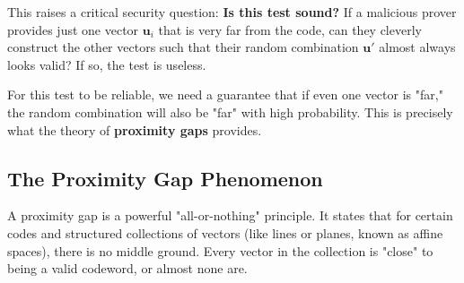 \documentclass{article}
\begin{document}
This raises a critical security question: \textbf{Is this test sound?} If a malicious prover provides just one vector $\mathbf{u}_i$ that is very far from the code, can they cleverly construct the other vectors such that their random combination $\mathbf{u}'$ almost always looks valid? If so, the test is useless.

For this test to be reliable, we need a guarantee that if even one vector is "far," the random combination will also be "far" with high probability. This is precisely what the theory of \textbf{proximity gaps} provides.

\subsection{The Proximity Gap Phenomenon}
A proximity gap is a powerful "all-or-nothing" principle. It states that for certain codes and structured collections of vectors (like lines or planes, known as affine spaces), there is no middle ground. Every vector in the collection is "close" to being a valid codeword, or almost none are.
\end{document}
